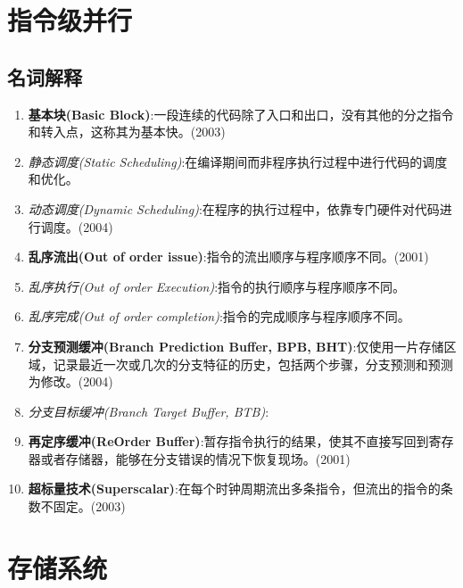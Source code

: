 \documentclass[a4paper]{ctexart}
\begin{document}
\section{指令级并行}
\subsection{名词解释}
\begin{enumerate}
  \item \textbf{基本块(Basic Block)}:一段连续的代码除了入口和出口，没有其他的分之指令和转入点，这称其为基本快。(2003)
  \item \emph{静态调度(Static Scheduling)}:在编译期间而非程序执行过程中进行代码的调度和优化。
  \item \emph{动态调度(Dynamic Scheduling)}:在程序的执行过程中，依靠专门硬件对代码进行调度。(2004)
  \item \textbf{乱序流出(Out of order issue)}:指令的流出顺序与程序顺序不同。(2001)
  \item \emph{乱序执行(Out of order Execution)}:指令的执行顺序与程序顺序不同。
  \item \emph{乱序完成(Out of order completion)}:指令的完成顺序与程序顺序不同。
  \item \textbf{分支预测缓冲(Branch Prediction Buffer, BPB, BHT)}:仅使用一片存储区域，记录最近一次或几次的分支特征的历史，包括两个步骤，分支预测和预测为修改。(2004)
  \item \emph{分支目标缓冲(Branch Target Buffer, BTB)}:
  \item \textbf{再定序缓冲(ReOrder Buffer)}:暂存指令执行的结果，使其不直接写回到寄存器或者存储器，能够在分支错误的情况下恢复现场。(2001)
  \item \textbf{超标量技术(Superscalar)}:在每个时钟周期流出多条指令，但流出的指令的条数不固定。(2003)
\end{enumerate}

\section{存储系统}
\end{document}

